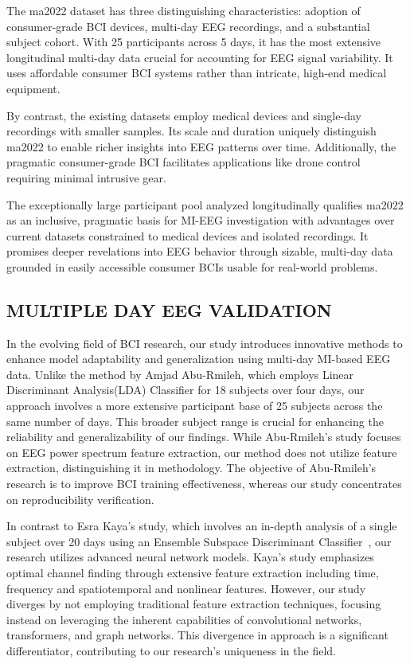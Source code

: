     The ma2022 dataset has three distinguishing characteristics: adoption of consumer-grade BCI devices, multi-day EEG recordings, and a substantial subject cohort. With 25 participants across 5 days, it has the most extensive longitudinal multi-day data crucial for accounting for EEG signal variability. It uses affordable consumer BCI systems rather than intricate, high-end medical equipment.

    By contrast, the existing datasets employ medical devices and single-day recordings with smaller samples. Its scale and duration uniquely distinguish ma2022 to enable richer insights into EEG patterns over time. Additionally, the pragmatic consumer-grade BCI facilitates applications like drone control requiring minimal intrusive gear.

    The exceptionally large participant pool analyzed longitudinally qualifies ma2022 as an inclusive, pragmatic basis for MI-EEG investigation with advantages over current datasets constrained to medical devices and isolated recordings. It promises deeper revelations into EEG behavior through sizable, multi-day data grounded in easily accessible consumer BCIs usable for real-world problems.
    \subsection{MULTIPLE DAY EEG VALIDATION}
    In the evolving field of BCI research, our study introduces innovative methods to enhance model adaptability and generalization using multi-day MI-based EEG data. Unlike the method by Amjad Abu-Rmileh\cite{kaya2023identifying}, which employs Linear Discriminant Analysis(LDA) Classifier for 18 subjects over four days, our approach involves a more extensive participant base of 25 subjects across the same number of days. This broader subject range is crucial for enhancing the reliability and generalizability of our findings. While Abu-Rmileh's study focuses on EEG power spectrum feature extraction, our method does not utilize feature extraction, distinguishing it in methodology. The objective of Abu-Rmileh's research is to improve BCI training effectiveness, whereas our study concentrates on reproducibility verification.

    In contrast to Esra Kaya's study, which involves an in-depth analysis of a single subject over 20 days using an Ensemble Subspace Discriminant Classifier~\cite{abu2019co}, our research utilizes advanced neural network models. Kaya's study emphasizes optimal channel finding through extensive feature extraction including time, frequency and spatiotemporal and nonlinear features. However, our study diverges by not employing traditional feature extraction techniques, focusing instead on leveraging the inherent capabilities of convolutional networks, transformers, and graph networks. This divergence in approach is a significant differentiator, contributing to our research's uniqueness in the field.

